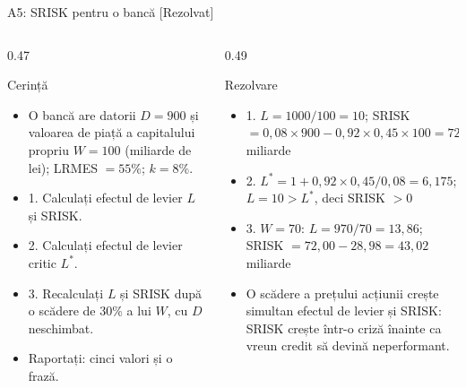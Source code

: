 \begin{frame}{A5: SRISK pentru o bancă [Rezolvat]}
\itemsize{\scriptsize}
\begin{columns}[T]
\begin{column}{0.47\textwidth}
\begin{block}{Cerință}
\begin{itemize}
    \item O bancă are datorii $D = 900$ și valoarea de piață a capitalului propriu $W = 100$ (miliarde de lei); LRMES $= 55\%$; $k = 8\%$.
    \item 1. Calculați efectul de levier $L$ și SRISK.
    \item 2. Calculați efectul de levier critic $L^*$.
    \item 3. Recalculați $L$ și SRISK după o scădere de 30\% a lui $W$, cu $D$ neschimbat.
    \item Raportați: cinci valori și o frază.
\end{itemize}
\end{block}
\end{column}
\begin{column}{0.49\textwidth}
\begin{exampleblock}{Rezolvare}
\begin{itemize}
    \item 1. $L = 1000/100 = 10$; SRISK $= 0{,}08 \times 900 - 0{,}92 \times 0{,}45 \times 100 = 72{,}00 - 41{,}40 = 30{,}60$ miliarde
    \item 2. $L^* = 1 + 0{,}92 \times 0{,}45/0{,}08 = 6{,}175$; $L = 10 > L^*$, deci SRISK $> 0$
    \item 3. $W = 70$: $L = 970/70 = 13{,}86$; SRISK $= 72{,}00 - 28{,}98 = 43{,}02$ miliarde
    \item O scădere a prețului acțiunii crește simultan efectul de levier și SRISK: SRISK crește într-o criză înainte ca vreun credit să devină neperformant.
\end{itemize}
\end{exampleblock}
\end{column}
\end{columns}
\end{frame}

